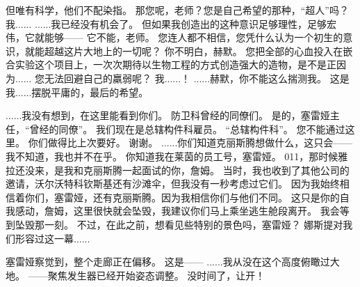 \documentclass[openany]{book}
\begin{document}
\begin{dialogue}
     但唯有科学，他们不配染指。
     那您呢，老师？您是自己希望的那种，“超人”吗？
     我......
     ......我已经没有机会了。
     但如果我创造出的这种意识足够理性，足够宏伟，它就能够——
     它不能，老师。
     您连人都不相信，您凭什么认为一个初生的意识，就能超越这片大地上的一切呢？
     你不明白，赫默。
     您把全部的心血投入在嵌合实验这个项目上，一次次期待以生物工程的方式创造强大的造物，是不是正因为......
     您无法回避自己的羸弱呢？
     我......！
     ......赫默，你不能这么揣测我。
     这是我......摆脱平庸的，最后的希望。
\end{dialogue}

\begin{dialogue}
     ......我没有想到，在这里能看到你们。
     防卫科曾经的同僚们。
     是的，塞雷娅主任，“曾经的同僚”。
     我们现在是总辖构件科雇员。
     “总辖构件科”。
     您不能通过这里。
     你们做得比上次要好。
     谢谢。
     ......你们知道克丽斯腾想做什么，这只会——
     我不知道，我也并不在乎。
     你知道我在莱茵的员工号，塞雷娅。
     011，那时候雅拉还没来，是我和克丽斯腾一起面试的你，詹姆。
     当时，我也收到了其他公司的邀请，沃尔沃特科钦斯基还有沙滩伞，但我没有一秒考虑过它们。
     因为我始终相信着你们，塞雷娅，还有克丽斯腾。因为我相信你们与他们不同。
     这只是你的自我感动，詹姆，这里很快就会坠毁，我建议你们马上乘坐逃生舱段离开。
     我会等到坠毁那一刻。
     不过，在此之前，想看见些特别的景色吗，塞雷娅？
     娜斯提对我们形容过这一幕......\par
    塞雷娅察觉到，整个走廊正在偏移。
     这是——
     ......我从没在这个高度俯瞰过大地。
     ——聚焦发生器已经开始姿态调整。
     没时间了，让开！
\end{dialogue}
\end{document}
